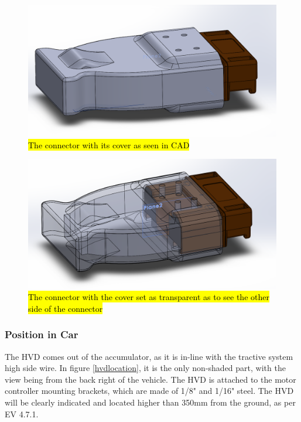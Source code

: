 \documentclass{article}
\DeclareRobustCommand{\hlr}[1]{{\sethlcolor{red}\hl{#1}}}
\begin{document}
            \begin{figure}[H]
                \centering
                \includegraphics[width = 0.75 \textwidth]{HVD_Cover}
                \caption{\hlr{The connector with its cover as seen in CAD}}
                \label{HVDwcover}
            \end{figure}

            \begin{figure}[H]
                \centering
                \includegraphics[width = 0.75 \textwidth]{HVD_Cover_t}
                \caption{\hlr{The connector with the cover set as transparent as to see the other side of the connector}}
                \label{HVDclearcover}
            \end{figure}

        \subsubsection{Position in Car}

            The HVD comes out of the accumulator, as it is in-line with the tractive system high side wire. In figure \ref{hvdlocation}, it is the only non-shaded part, with the view being from the back right of the vehicle. The HVD is attached to the motor controller mounting brackets, which are made of 1/8" and 1/16" steel. The HVD will be clearly indicated and located higher than 350mm from the ground, as per EV 4.7.1.
\end{document}
